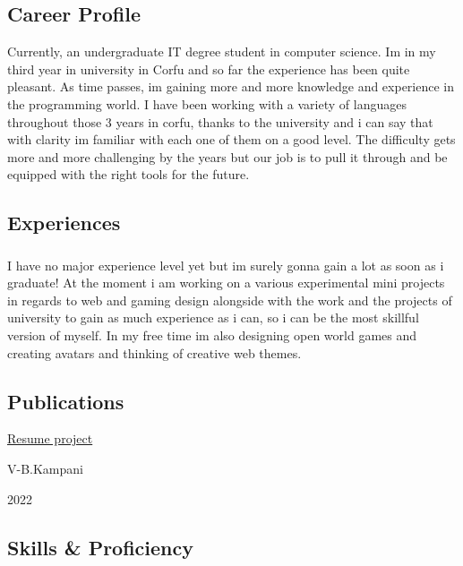 \documentclass[english,]{article}
\begin{document}
\hypertarget{career-profile}{%
\subsection{\texorpdfstring{{ \emph{} \emph{} } Career
Profile}{    Career Profile}}\label{career-profile}}

Currently, an undergraduate IT degree student in computer science. Im in
my third year in university in Corfu and so far the experience has been
quite pleasant. As time passes, im gaining more and more knowledge and
experience in the programming world. I have been working with a variety
of languages throughout those 3 years in corfu, thanks to the university
and i can say that with clarity im familiar with each one of them on a
good level. The difficulty gets more and more challenging by the years
but our job is to pull it through and be equipped with the right tools
for the future.

\hypertarget{experiences}{%
\subsection{\texorpdfstring{{ \emph{} \emph{} }
Experiences}{    Experiences}}\label{experiences}}

\hypertarget{section-2}{%
\subsubsection{}\label{section-2}}

I have no major experience level yet but im surely gonna gain a lot as
soon as i graduate! At the moment i am working on a various experimental
mini projects in regards to web and gaming design alongside with the
work and the projects of university to gain as much experience as i can,
so i can be the most skillful version of myself. In my free time im also
designing open world games and creating avatars and thinking of creative
web themes.

\hypertarget{publications}{%
\subsection{\texorpdfstring{{ \emph{} \emph{} }
Publications}{    Publications}}\label{publications}}

\href{https://vasiliskampani.github.io/online-cv/}{Resume project}

V-B.Kampani

2022

\hypertarget{skills-proficiency}{%
\subsection{\texorpdfstring{{ \emph{} \emph{} } Skills \&
Proficiency}{    Skills \& Proficiency}}\label{skills-proficiency}}
\end{document}
